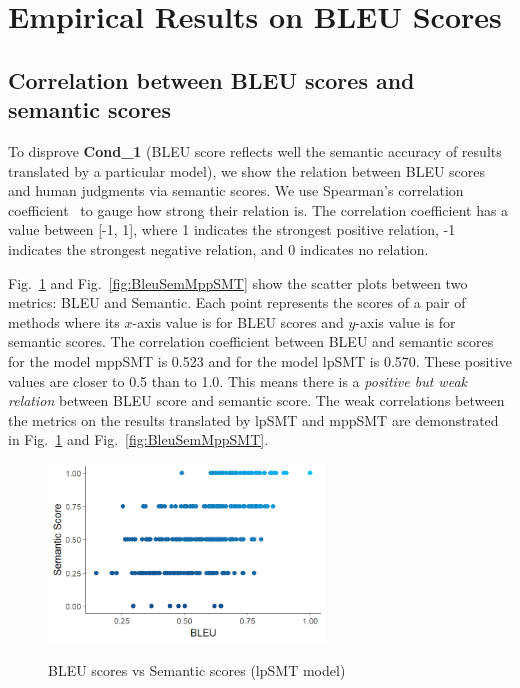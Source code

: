 \section{Empirical Results on BLEU Scores}
\label{sec:bleuresult}


\subsection{Correlation between BLEU scores and semantic scores}


To disprove {\bf Cond\_1} (BLEU score reflects well the semantic
accuracy of results translated by a particular model), we show the
relation between BLEU scores and human judgments via semantic scores.
We use Spearman's correlation coefficient~\cite{geek_2015} to gauge how
strong their relation is. The correlation coefficient has a value
between [-1, 1], where 1 indicates the strongest positive relation, -1
indicates the strongest negative relation, and 0 indicates no
relation.

Fig.~\ref{fig:BleuSemlpSMT} and Fig.~\ref{fig:BleuSemMppSMT} show the
scatter plots between two metrics: BLEU and Semantic. Each point
represents the scores of a pair of methods where its $x$-axis value is
for BLEU scores and $y$-axis value is for semantic scores. The
correlation coefficient between BLEU and semantic scores for the model
mppSMT is 0.523 and for the model lpSMT is 0.570. These positive values
are closer to 0.5 than to 1.0. This means there is a {\em positive but weak
relation} between BLEU score and semantic score. The weak correlations %
between the metrics on the results translated by lpSMT and mppSMT are
demonstrated in Fig.~\ref{fig:BleuSemlpSMT} and Fig.~\ref{fig:BleuSemMppSMT}.



\begin{figure}
\caption{BLEU scores vs Semantic scores (lpSMT model)}
\centering
\includegraphics[width=2.9in]{img/bleuvssemantic_lpSMT.png}
\label{fig:BleuSemlpSMT}
\end{figure}


